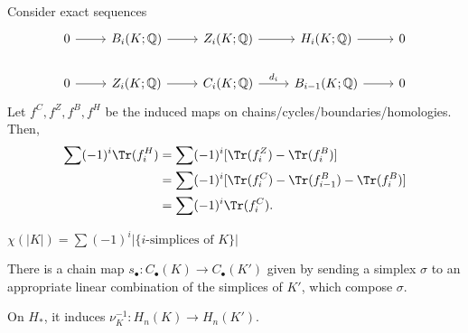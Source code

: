 \documentclass[12pt]{article}
\begin{document}
\begin{proofbox}
	Consider exact sequences
	\begin{equation*}
		\begin{tikzcd}
			0 \arrow[r] & {B_i(K; \mathbb{Q})} \arrow[r] & {Z_i(K; \mathbb{Q})} \arrow[r] & {H_i(K; \mathbb{Q})} \arrow[r] & 0 \\
0 \arrow[r] & {Z_i(K; \mathbb{Q})} \arrow[r] & {C_i(K; \mathbb{Q})} \arrow[r, "d_i"] & {B_{i-1}(K; \mathbb{Q})} \arrow[r] & 0
		\end{tikzcd}	
	\end{equation*}
	Let $f^C, f^Z, f^B, f^H$ be the induced maps on chains/cycles/boundaries/homologies. Then,
	\begin{align*}
		\sum (-1)^i \Tr(f_i^H) &= \sum (-1)^i [\Tr(f_i^Z) - \Tr(f_i^B)] \\
				       &= \sum (-1)^i [\Tr(f_i^C) - \Tr(f_{i-1}^B) - \Tr(f_i^B)] \\
				       &= \sum(-1)^i \Tr(f_i^C).
	\end{align*}
\end{proofbox}

\begin{corollary}
	$\chi(|K|) = \sum (-1)^i |\{\text{$i$-simplices of $K$}\}|$
\end{corollary}


\begin{lemma}
	There is a chain map $s_\bullet : C_\bullet(K) \to C_\bullet(K')$ given by sending a simplex $\sigma$ to an appropriate linear combination of the simplices of $K'$, which compose $\sigma$.

	On $H_\ast$, it induces $\nu_K^{-1} : H_n(K) \to H_n(K')$.
\end{lemma}
\end{document}
